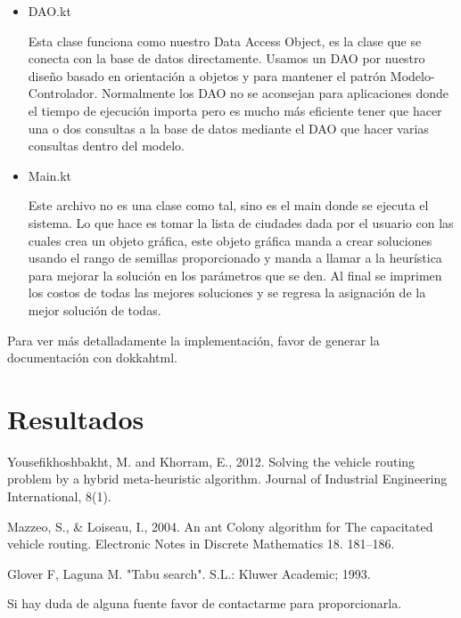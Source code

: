 \documentclass{article}
\begin{document}
\begin{itemize}
{	}
	\item {DAO.kt
		
		Esta clase funciona como nuestro Data Access Object, es la clase que se conecta con la base de datos directamente. Usamos un DAO por nuestro diseño basado en orientación a objetos y para mantener el patrón Modelo-Controlador. Normalmente los DAO no se aconsejan para aplicaciones donde el tiempo de ejecución importa pero es mucho más eficiente tener que hacer una o dos consultas a la base de datos mediante el DAO que hacer varias consultas dentro del modelo.
	}
	\item {Main.kt
		
		Este archivo no es una clase como tal, sino es el main donde se ejecuta el sistema. Lo que hace es tomar la lista de ciudades dada por el usuario con las cuales crea un objeto gráfica, este objeto gráfica manda a crear soluciones usando el rango de semillas proporcionado y manda a llamar a la heurística para mejorar la solución en los parámetros que se den. Al final se imprimen los costos de todas las mejores soluciones y se regresa la asignación de la mejor solución de todas.
	}
\end{itemize}

Para ver más detalladamente la implementación, favor de generar la documentación con dokkahtml.


\section{Resultados}

\begin{thebibliography}{9}
	Yousefikhoshbakht, M. and Khorram, E., 2012. Solving the vehicle routing problem by a hybrid meta-heuristic algorithm. Journal of Industrial Engineering International, 8(1).
	
	Mazzeo, S., \& Loiseau, I., 2004. An ant Colony algorithm for The capacitated vehicle routing. Electronic Notes in Discrete Mathematics 18. 181–186.
	
	Glover F, Laguna M. "Tabu search". S.L.: Kluwer Academic; 1993.  
\end{thebibliography}

Si hay duda de alguna fuente favor de contactarme para proporcionarla.
\end{document}
